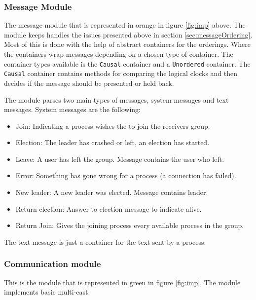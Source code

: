 \subsubsection{Message Module}
The message module that is represented in orange in figure \ref{fig:imp} above. The module keeps handles the issues presented above in section \ref{sec:messageOrdering}. Most of this is done with the help of abstract containers for the orderings. Where the containers wrap messages depending on a chosen type of container. The container types available is the \texttt{Causal} container and a \texttt{Unordered} container. The \texttt{Causal} container contains methods for comparing the logical clocks and then decides if the message should be presented or held back.

The module parses two main types of messages, system messages and text messages. System messages are the following:

\begin{itemize}
	\item Join: Indicating a process wishes the to join the receivers group.
	\item Election: The leader has crashed or left, an election has started.
	\item Leave: A user has left the group. Message contains the user who left.
	\item Error: Something has gone wrong for a process (a connection has failed).
	\item New leader: A new leader was elected. Message contains leader.
	\item Return election: Answer to election message to indicate alive.
	\item Return Join: Gives the joining process every available process in the group.
\end{itemize}

The text message is just a container for the text sent by a process.

\subsubsection{Communication module}
This is the module that is represented in green in figure \ref{fig:imp}. The module implements basic multi-cast. 

 




